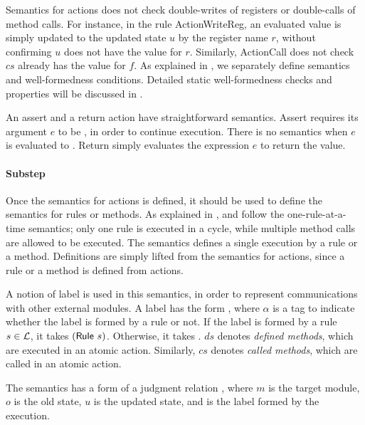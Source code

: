 Semantics for actions does not check double-writes of registers or
double-calls of method calls. For instance, in the rule
ActionWriteReg, an evaluated value is simply updated to the updated
state $u$ by the register name $r$, without confirming $u$ does not
have the value for $r$. Similarly, ActionCall does not check $cs$
already has the value for $f$. As explained in
, we separately define semantics and
well-formedness conditions. Detailed static well-formedness checks and
properties will be discussed in .

An assert and a return action have straightforward semantics. Assert
requires its argument $e$ to be \btrue{}, in order to continue
execution. There is no semantics when $e$ is evaluated to \bfalse{}.
Return simply evaluates the expression $e$ to return the value.

\paragraph{Substep}
Once the semantics for actions is defined, it should be used to define
the semantics for rules or methods. As explained in
, \Bluespec{} and \Kami{} follow the
one-rule-at-a-time semantics; only one rule is executed in a cycle,
while multiple method calls are allowed to be executed. The \Substep{}
semantics defines a single execution by a rule or a method.
Definitions are simply lifted from the semantics for actions, since a
rule or a method is defined from actions.

A notion of label is used in this semantics, in order to represent
communications with other external modules. A label has the form
, where $\alpha$ is a tag to indicate whether
the label is formed by a rule or not. If the label is formed by a rule
$s \in \mathcal{L}$, it takes $(\textsf{Rule}\ s)$. Otherwise, it takes
\alphameth{}. $ds$ denotes \emph{defined methods}, which are executed
in an atomic action. Similarly, $cs$ denotes \emph{called methods},
which are called in an atomic action.

The \Substep{} semantics has a form of a judgment relation
, where $m$ is the target module,
$o$ is the old state, $u$ is the updated state, and
 is the label formed by the execution.

